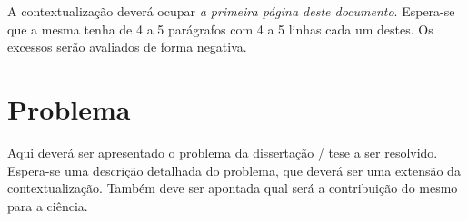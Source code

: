 \documentclass[a4paper,11pt]{article}
\begin{document}
A contextualização deverá ocupar \emph{a primeira página deste documento}. Espera-se que a mesma tenha de 4 a 5 parágrafos com 4 a 5 linhas cada um destes. Os excessos serão avaliados de forma negativa.

\section{Problema}
Aqui deverá ser apresentado o problema da dissertação / tese a ser resolvido. Espera-se uma descrição detalhada do problema, que deverá ser uma extensão da contextualização. Também deve ser apontada qual será a contribuição do mesmo para a ciência. 



\end{document}
